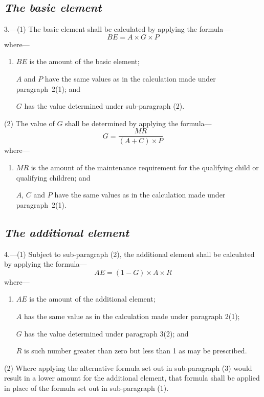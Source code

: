 \documentclass[12pt,a4paper]{article}
\begin{document}
\subsection*{\itshape The basic element}

3.---(1) The basic element shall be calculated by applying the formula—
\[
BE = A \times G \times P
\]
where—
\begin{enumerate}\item[]
    $BE$ is the amount of the basic element;

    $A$ and $P$ have the same values as in the calculation made under paragraph~2(1); and

    $G$ has the value determined under sub-paragraph (2). 
\end{enumerate}

(2) The value of $G$ shall be determined by applying the formula—
\[
G = \frac{MR}{(A + C) \times P}
\]
where—
\begin{enumerate}\item[]
    $MR$ is the amount of the maintenance requirement for the qualifying child or qualifying children; and

    $A$, $C$ and $P$ have the same values as in the calculation made under paragraph~2(1). 
\end{enumerate}


\subsection*{\itshape The additional element}

4.---(1) Subject to sub-paragraph (2), the additional element shall be calculated by applying the formula—
\[
AE = (1 - G) \times A \times R
\]
where—
\begin{enumerate}\item[]
    $AE$ is the amount of the additional element;

    $A$ has the same value as in the calculation made under paragraph 2(1);

    $G$ has the value determined under paragraph 3(2); and

    $R$ is such number greater than zero but less than 1 as may be prescribed. 
\end{enumerate}

(2) Where applying the alternative formula set out in sub-paragraph (3)  would result in a lower amount for the additional element, that formula shall be applied in place of the formula set out in sub-paragraph (1).
\end{document}
